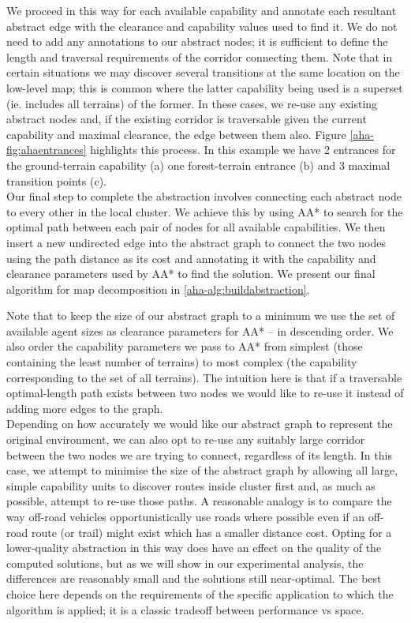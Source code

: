 We proceed in this way for each available capability and annotate each resultant abstract edge with the clearance and capability values used to find it. We do not need to add any annotations to our abstract nodes; it is sufficient to define the length and traversal requirements of the corridor connecting them. Note that in certain situations we may discover several transitions at the same location on the low-level map; this is common where the latter capability being used is a superset (ie. includes all terrains) of the former. In these cases, we re-use any existing abstract nodes and, if the existing corridor is traversable given the current capability and maximal clearance, the edge between them also. Figure \ref{aha-fig:ahaentrances} highlights this process. In this example we have 2 entrances for the ground-terrain capability (a) one forest-terrain entrance (b) and 3 maximal transition points (c).\\ \newline
Our final step to complete the abstraction involves connecting each abstract node to every other in the local cluster. We achieve this by using AA* to search for the optimal path between each pair of nodes for all available capabilities. We then insert a new undirected edge into the abstract graph to connect the two nodes using the path distance as its cost and annotating it with the capability and clearance parameters used by AA* to find the solution. We present our final algorithm for map decomposition in \ref{aha-alg:buildabstraction}.



Note that to keep the size of our abstract graph to a minimum we use the set of available agent sizes as clearance parameters for AA* -- in descending order. We also order the capability parameters we pass to AA* from simplest (those containing the least number of terrains) to most complex (the capability corresponding to the set of all terrains). The intuition here is that if a traversable optimal-length path exists between two nodes we would like to re-use it instead of adding more edges to the graph. \\
Depending on how accurately we would like our abstract graph to represent the original environment, we can also opt to re-use any suitably large corridor between the two nodes we are trying to connect, regardless of its length. In this case, we attempt to minimise the size of the abstract graph by allowing all large, simple capability units to  discover routes inside cluster first and, as much as possible, attempt to re-use those paths. A reasonable analogy is to compare the way off-road vehicles opportunistically use roads where possible even if an off-road route (or trail) might exist which has a smaller distance cost. Opting for a lower-quality abstraction in this way does have an effect on the quality of the computed solutions, but as we will show in our experimental analysis, the differences are reasonably small and the solutions still near-optimal. The best choice here depends on the requirements of the specific application to which the algorithm is applied; it is a classic tradeoff between performance vs space.


